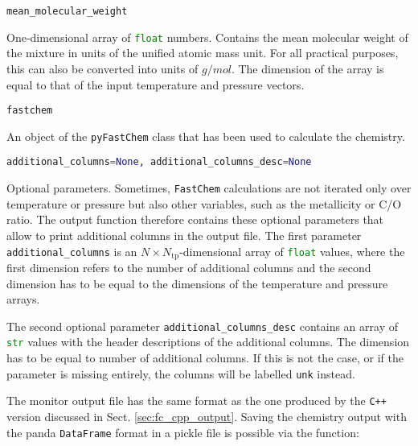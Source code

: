 \documentclass[numbers=noenddot]{aux/fcmanual}
\newcommand{\fc}{\texttt{FastChem}\xspace}
\newcommand{\pfc}{\texttt{pyFastChem}\xspace}
\newcommand{\cpp}{\ttt{C++}\xspace}
\newcommand{\ttt}[1]{\texttt {#1}}
\begin{document}
\bigbreak

\lstinline!mean_molecular_weight!
\begin{addmargin}[25pt]{0pt}
	One-dimensional array of \lstinline[language=Python]!float! numbers. Contains the mean molecular weight of the mixture in units of the unified atomic mass unit. For all practical purposes, this can also be converted into units of $\unit{g/mol}$. The dimension of the array is equal to that of the input temperature and pressure vectors.
\end{addmargin}

\bigbreak

\lstinline[language=Python]!fastchem!
\begin{addmargin}[25pt]{0pt}
	An object of the \pfc class that has been used to calculate the chemistry. 
\end{addmargin}

\bigbreak

\lstinline[language=Python]!additional_columns=None, additional_columns_desc=None!
\begin{addmargin}[25pt]{0pt}
	Optional parameters. Sometimes, \fc calculations are not iterated only over temperature or pressure but also other variables, such as the metallicity or C/O ratio. The output function therefore contains these optional parameters that allow to print additional columns in the output file. The first parameter \lstinline[language=Python]!additional_columns! is an $N\times N_\mathrm{tp}$-dimensional array of \lstinline[language=Python]!float! values, where the first dimension refers to the number of additional columns and the second dimension has to be equal to the dimensions of the temperature and pressure arrays. 
	
	The second optional parameter \lstinline[language=Python]!additional_columns_desc! contains an array of \lstinline[language=Python]!str! values with the header descriptions of the additional columns. The dimension has to be equal to number of additional columns. If this is not the case, or if the parameter is missing entirely, the columns will be labelled \texttt{unk} instead.
\end{addmargin}

\bigbreak

The monitor output file has the same format as the one produced by the \cpp version discussed in Sect. \ref{sec:fc_cpp_output}. Saving the chemistry output with the panda \lstinline[language=Python]!DataFrame! format in a pickle file is possible via the function:
\end{document}
